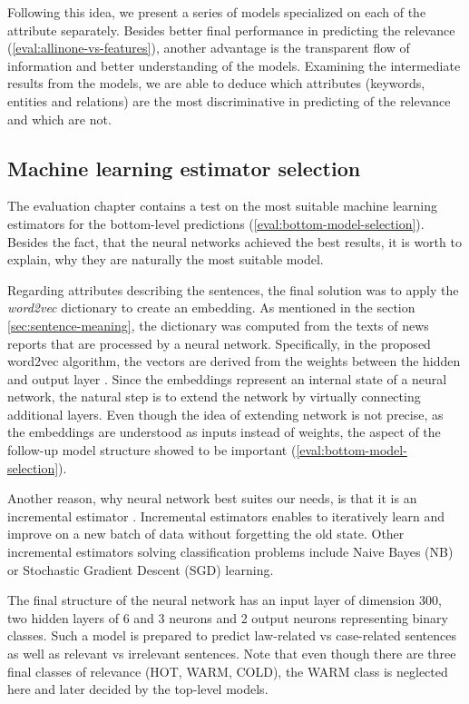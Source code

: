 \documentclass[
  digital, %
  notable,   %
  nolof,     %
  nolot,     %
  draft
]{fithesis3}
\begin{document}
Following this idea, we present a series of models specialized on each of the attribute separately.
Besides better final performance in predicting the relevance (\ref{eval:allinone-vs-features}), another advantage is the transparent flow of information and better understanding of the models.
Examining the intermediate results from the models, we are able to deduce which attributes (keywords, entities and relations) are the most discriminative in predicting of the relevance and which are not.

\subsection{Machine learning estimator selection}
\label{sec:bottom-level-nn}
The evaluation chapter contains a test on the most suitable machine learning estimators for the bottom-level predictions (\ref{eval:bottom-model-selection}).
Besides the fact, that the neural networks achieved the best results, it is worth to explain, why they are naturally the most suitable model.

Regarding attributes describing the sentences, the final solution was to apply the \textit{word2vec} dictionary to create an embedding.
As mentioned in the section \ref{sec:sentence-meaning}, the dictionary was computed from the texts of news reports that are processed by a neural network.
Specifically, in the proposed word2vec algorithm, the vectors are derived from the weights between the hidden and output layer \cite[sec. 2.2.1]{wordEmbeddings}.
Since the embeddings represent an internal state of a neural network, the natural step is to extend the network by virtually connecting additional layers.
Even though the idea of extending network is not precise, as the embeddings are understood as inputs instead of weights, the aspect of the follow-up model structure showed to be important (\ref{eval:bottom-model-selection}).

Another reason, why neural network best suites our needs, is that it is an incremental estimator \cite{incrementalScikit}.
Incremental estimators enables to iteratively learn and improve on a new batch of data without forgetting the old state.
Other incremental estimators solving classification problems include Naive Bayes (NB) or Stochastic Gradient Descent (SGD) learning.

The final structure of the neural network has an input layer of dimension 300, two hidden layers of 6 and 3 neurons and 2 output neurons representing binary classes.
Such a model is prepared to predict law-related vs case-related sentences as well as relevant vs irrelevant sentences. Note that even though there are three final classes of relevance (HOT, WARM, COLD), the WARM class is neglected here and later decided by the top-level models.
\end{document}
